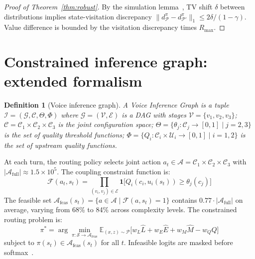 \documentclass{article}
\newtheorem{definition}{Definition}
\begin{document}
\begin{proof}[Proof of Theorem~\ref{thm:robust}]
By the simulation lemma~\citep{kakade2002natural}, TV shift $\delta$ between distributions implies state-visitation discrepancy $\|d^{\pi}_\mathcal{P}-d^{\pi}_{\mathcal{P}'}\|_1\leq2\delta/(1-\gamma)$. Value difference is bounded by the visitation discrepancy times $R_{\max}$.
\end{proof}

\section{Constrained inference graph: extended formalism}
\label{app:inference_graph}

\begin{definition}[Voice inference graph]
A \emph{Voice Inference Graph} is a tuple $\mathcal{I} = (\mathcal{G}, \mathcal{C}, \Theta, \Phi)$ where $\mathcal{G} = (\mathcal{V}, \mathcal{E})$ is a DAG with stages $\mathcal{V} = \{v_1, v_2, v_3\}$; $\mathcal{C} = \mathcal{C}_1 \times \mathcal{C}_2 \times \mathcal{C}_3$ is the joint configuration space; $\Theta = \{\theta_j : \mathcal{C}_j \to [0,1] \mid j = 2,3\}$ is the set of quality threshold functions; $\Phi = \{Q_i : \mathcal{C}_i \times \mathcal{U}_i \to [0,1] \mid i = 1,2\}$ is the set of upstream quality functions.
\end{definition}

At each turn, the routing policy selects joint action $a_t \in \mathcal{A} = \mathcal{C}_1 \times \mathcal{C}_2 \times \mathcal{C}_3$ with $|\mathcal{A}_{\text{full}}| \approx 1.5 \times 10^5$. The coupling constraint function is:
\begin{equation}
\mathcal{F}(a_t, s_t) = \prod_{(v_i, v_j) \in \mathcal{E}} \mathbf{1}\bigl[Q_i(c_i, u_i(s_t)) \geq \theta_j(c_j)\bigr]
\end{equation}
The feasible set $\mathcal{A}_{\text{feas}}(s_t) = \{a \in \mathcal{A} \mid \mathcal{F}(a, s_t) = 1\}$ contains $0.77 \cdot |\mathcal{A}_{\text{full}}|$ on average, varying from 68\% to 84\% across complexity levels. The constrained routing problem is:
\begin{equation}
\pi^* = \arg\min_{\pi:\mathcal{S}\to\mathcal{A}_{\text{feas}}} \mathbb{E}_{(x,z)\sim\mathcal{P}}\bigl[w_L\hat{L} + w_E\hat{E} + w_M\hat{M} - w_QQ\bigr]
\end{equation}
subject to $\pi(s_t) \in \mathcal{A}_{\text{feas}}(s_t)$ for all $t$. Infeasible logits are masked before softmax~\citep{schulman2017ppo,kakade2002approx}.
\end{document}

